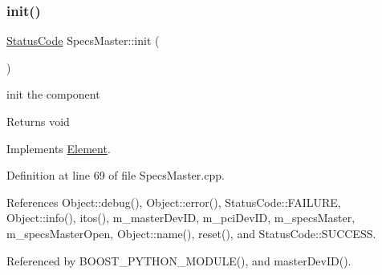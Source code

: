 \subsubsection{\texorpdfstring{init()}{init()}}
{\footnotesize\ttfamily \hyperlink{classStatusCode}{Status\+Code} Specs\+Master\+::init (\begin{DoxyParamCaption}{ }\end{DoxyParamCaption})\hspace{0.3cm}{\ttfamily [virtual]}}

init the component

\begin{DoxyReturn}{Returns}
void 
\end{DoxyReturn}


Implements \hyperlink{classElement_af42754b5cabc198869222725218d695c}{Element}.



Definition at line 69 of file Specs\+Master.\+cpp.



References Object\+::debug(), Object\+::error(), Status\+Code\+::\+F\+A\+I\+L\+U\+RE, Object\+::info(), itos(), m\+\_\+master\+Dev\+ID, m\+\_\+pci\+Dev\+ID, m\+\_\+specs\+Master, m\+\_\+specs\+Master\+Open, Object\+::name(), reset(), and Status\+Code\+::\+S\+U\+C\+C\+E\+SS.



Referenced by B\+O\+O\+S\+T\+\_\+\+P\+Y\+T\+H\+O\+N\+\_\+\+M\+O\+D\+U\+L\+E(), and master\+Dev\+I\+D().


